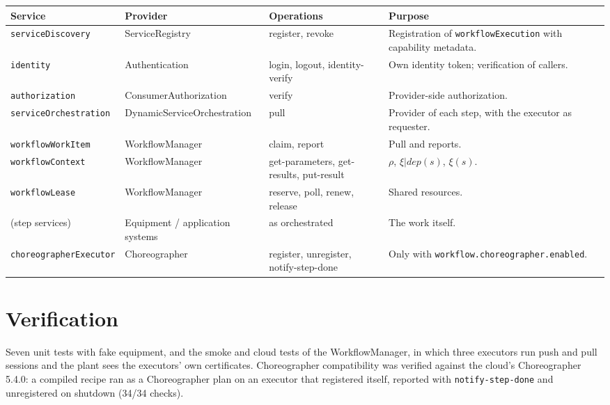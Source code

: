 \documentclass[a4paper]{arrowhead}
\begin{document}
{\small
\begin{longtable}{|p{3.4cm}|p{3.2cm}|p{3.6cm}|p{5.6cm}|}

\hline
\rowcolor{gray!33} Service & Provider & Operations & Purpose \\ \hline
\endhead
\texttt{serviceDiscovery} & ServiceRegistry & register, revoke & Registration of \texttt{workflowExecution} with capability metadata. \\ \hline
\texttt{identity} & Authentication & login, logout, identity-verify & Own identity token; verification of callers. \\ \hline
\texttt{authorization} & ConsumerAuthorization & verify & Provider-side authorization. \\ \hline
\texttt{serviceOrchestration} & DynamicServiceOrchestration & pull & Provider of each step, with the executor as requester. \\ \hline
\texttt{workflowWorkItem} & WorkflowManager & claim, report & Pull and reports. \\ \hline
\texttt{workflowContext} & WorkflowManager & get-parameters, get-results, put-result & $\rho$, $\xi|dep(s)$, $\xi(s)$. \\ \hline
\texttt{workflowLease} & WorkflowManager & reserve, poll, renew, release & Shared resources. \\ \hline
(step services) & Equipment / application systems & as orchestrated & The work itself. \\ \hline
\texttt{choreographerExecutor} & Choreographer & register, unregister, notify-step-done & Only with \texttt{workflow.choreographer.enabled}. \\ \hline
\end{longtable}
}


\section{Verification}
\label{sec:verification}
Seven unit tests with fake equipment, and the smoke and cloud tests of the WorkflowManager, in which three executors
run push and pull sessions and the plant sees the executors' own certificates. Choreographer compatibility was
verified against the cloud's Choreographer 5.4.0: a compiled recipe ran as a Choreographer plan on an executor that
registered itself, reported with \texttt{notify-step-done} and unregistered on shutdown (34/34 checks).
\end{document}
